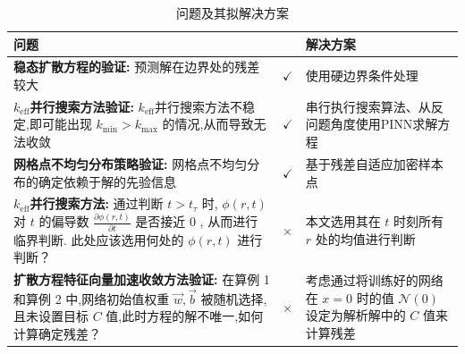 \documentclass{Sichuan Normal University}
\begin{document}
{\begin{table}[H]
    \caption{问题及其拟解决方案}
    \label{tab:发现问题与解决方案}
    \centering
    \begin{tabular}{p{9cm}p{0.2cm}p{5cm}}
        \toprule 
        \textbf{问题} &  &\textbf{解决方案}\\
        \midrule 
        \textbf{稳态扩散方程的验证:} 预测解在边界处的残差较大  & $\checkmark$ & 使用硬边界条件处理\\
        \textbf{$k_{\text{eff}}$并行搜索方法验证:} $k_{\text{eff}}$并行搜索方法不稳定,即可能出现 $k_{\min} > k_{\max}$ 的情况,从而导致无法收敛 & $\checkmark$& 串行执行搜索算法、从反问题角度使用PINN求解方程 \\
        \textbf{网格点不均匀分布策略验证:} 网格点不均匀分布的确定依赖于解的先验信息  &$\checkmark$ & 基于残差自适应加密样本点\\
        \textbf{$k_{\text{eff}}$并行搜索方法:} 通过判断 $t > t_\tau$ 时, $\phi(r, t)$ 对 $t$ 的偏导数 $\frac{\partial\phi(r, t)}{\partial t}$ 是否接近 0 , 从而进行临界判断. 此处应该选用何处的 $\phi(r, t)$ 进行判断？ & $\times$& 本文选用其在 $t$ 时刻所有 $r$ 处的均值进行判断 \\
        \textbf{扩散方程特征向量加速收敛方法验证:} 在算例 1 和算例 2 中,网络初始值权重 ${\vec{w}, \vec{b}}$ 被随机选择,且未设置目标 $C$ 值,此时方程的解不唯一,如何计算确定残差？ & $\times$& 考虑通过将训练好的网络在 $x=0$ 时的值 $\mathcal{N}(0)$ 设定为解析解中的 $C$ 值来计算残差 \\
        \bottomrule
    \end{tabular}
\end{table}}
\newpage


\end{document}
